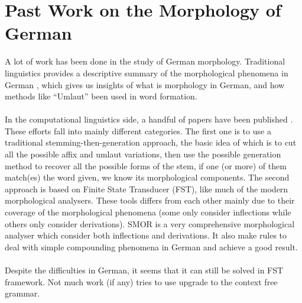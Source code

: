 \documentclass[11pt,letterpaper]{article}
\begin{document}
\section{Past Work on the Morphology of German}
A lot of work has been done in the study of German morphology. Traditional linguistics provides a descriptive summary of the morphological phenomena in German \citep{glli} \citep{fox}, which gives us insights of what is morphology in German, and how methods like ``Umlaut'' been used in word formation.\\\\
In the computational linguistics side, a handful of papers have been published \citep{lez96} \citep{lez98} \citep{lez00} \citep{sch04}. These efforts fall into mainly different categories. The first one is to use a traditional stemming-then-generation approach, the basic idea of which is to cut all the possible affix and umlaut variations, then use the possible generation method to recover all the possible forms of the stem, if one (or more) of them match(es) the word given, we know its morphological components. The second approach is based on Finite State Transducer (FST), like much of the modern morphological analysers. These tools differs from each other mainly due to their coverage of the morphological phenomena (some only consider inflections while others only consider derivations). SMOR \citep{sch04} is a very comprehensive morphological analyser which consider both inflections and derivations. It also make rules to deal with simple compounding phenomena in German and achieve a good result. \\\\
Despite the difficulties in German, it seems that it can still be solved in FST framework. Not much work (if any) tries to use upgrade to the context free grammar. 
\end{document}
